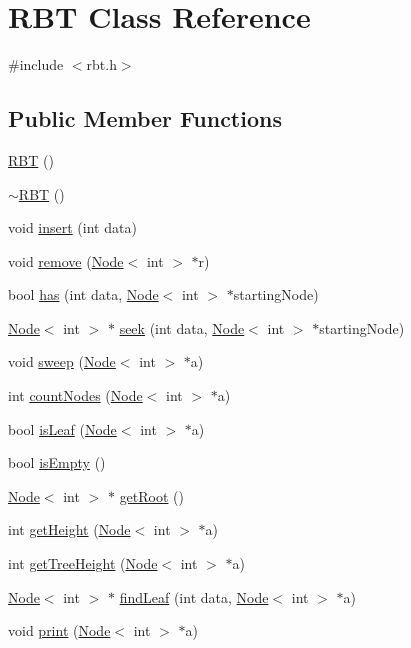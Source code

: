 \hypertarget{class_r_b_t}{}\section{R\+B\+T Class Reference}
\label{class_r_b_t}


{\ttfamily \#include $<$rbt.\+h$>$}

\subsection*{Public Member Functions}
\begin{DoxyCompactItemize}
\item 
\hyperlink{class_r_b_t_ae7666dcf00e7ed5676cd0fa40922c7fc}{R\+B\+T} ()
\item 
\hyperlink{class_r_b_t_ab8f9f6ec8bdb3c9a72ba1efe05c845b4}{$\sim$\+R\+B\+T} ()
\item 
void \hyperlink{class_r_b_t_a5317230aa155fefa42dac156a7b0d3b8}{insert} (int data)
\item 
void \hyperlink{class_r_b_t_aa15c08f9d5b84a394b2496bd03b64c28}{remove} (\hyperlink{classrbtn_1_1_node}{Node}$<$ int $>$ $\ast$r)
\item 
bool \hyperlink{class_r_b_t_a049f674584997633fc6fa8cfeac1aed5}{has} (int data, \hyperlink{classrbtn_1_1_node}{Node}$<$ int $>$ $\ast$starting\+Node)
\item 
\hyperlink{classrbtn_1_1_node}{Node}$<$ int $>$ $\ast$ \hyperlink{class_r_b_t_ae2a1a4ec6a90a686752ec8162a17ddef}{seek} (int data, \hyperlink{classrbtn_1_1_node}{Node}$<$ int $>$ $\ast$starting\+Node)
\item 
void \hyperlink{class_r_b_t_ab4ae066abece7981679eb0ff25fb22ed}{sweep} (\hyperlink{classrbtn_1_1_node}{Node}$<$ int $>$ $\ast$a)
\item 
int \hyperlink{class_r_b_t_ab3ebd2ba6c338f0199e08943f8b05466}{count\+Nodes} (\hyperlink{classrbtn_1_1_node}{Node}$<$ int $>$ $\ast$a)
\item 
bool \hyperlink{class_r_b_t_a7ca9b69fbd7acf0f0c3c5e34980a6574}{is\+Leaf} (\hyperlink{classrbtn_1_1_node}{Node}$<$ int $>$ $\ast$a)
\item 
bool \hyperlink{class_r_b_t_ac050cefa293a6e63bfff6b95af7f9eb1}{is\+Empty} ()
\item 
\hyperlink{classrbtn_1_1_node}{Node}$<$ int $>$ $\ast$ \hyperlink{class_r_b_t_a0c993ec3870997beaefe066e3b99a5fc}{get\+Root} ()
\item 
int \hyperlink{class_r_b_t_a4651b1e4d5d8c4cef7e9a5a4f6a05f40}{get\+Height} (\hyperlink{classrbtn_1_1_node}{Node}$<$ int $>$ $\ast$a)
\item 
int \hyperlink{class_r_b_t_a79e6805c92b057cf23bba482f9205d07}{get\+Tree\+Height} (\hyperlink{classrbtn_1_1_node}{Node}$<$ int $>$ $\ast$a)
\item 
\hyperlink{classrbtn_1_1_node}{Node}$<$ int $>$ $\ast$ \hyperlink{class_r_b_t_a570388372d0cce244e0e8eec668f2814}{find\+Leaf} (int data, \hyperlink{classrbtn_1_1_node}{Node}$<$ int $>$ $\ast$a)
\item 
void \hyperlink{class_r_b_t_ab45a3d4e6cc64d31ed8fbe84e4b9d446}{print} (\hyperlink{classrbtn_1_1_node}{Node}$<$ int $>$ $\ast$a)
\end{DoxyCompactItemize}



